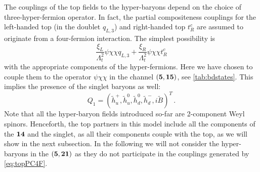 \documentclass[preprintnumbers,nofootinbib,showpacs,eqsecnum,pre,12pt]{revtex4-1}
\begin{document}
The couplings of the top fields to the hyper-baryons depend on the choice of three-hyper-fermion operator. In fact, the partial compositeness couplings for the left-handed top (in the doublet $q_{L,3}$) and right-handed top $t_R^c$ are assumed to originate from a four-fermion interaction. The simplest possibility is
\begin{equation} \label{eq:topPC4F}
    \frac{\xi_L}{\Lambda_t^2} \psi \chi \chi q_{L,3} + \frac{\xi_R}{\Lambda_t^2} \psi \chi \chi t_{R}^c 
\end{equation}
with the appropriate components of the hyper-fermions. Here we have chosen to couple them to the operator $\psi \chi \chi$ in the channel $({\bf 5}, {\bf 15})$, see \cref{tab:bdstates}. This implies the presence of the singlet baryons as well:
\begin{equation}
Q_1 = (\tilde h^+_u, \tilde h^0_u, \tilde h^0_d, \tilde h^-_d, i \tilde B)^T\,. \label{eq:q1compo}
\end{equation}
Note that all the hyper-baryon fields introduced so-far are 2-component Weyl spinors.  
Henceforth, the top partners in this model include all the components of the $\bf 14$ and the singlet, as all their components couple with the top, as we will show in the next subsection. In the following we will not consider the hyper-baryons in the $(\bf{5}, \bf{21})$ as they do not participate in the couplings generated by \cref{eq:topPC4F}.
\end{document}
